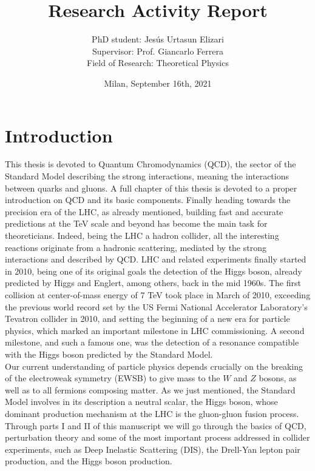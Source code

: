 \documentclass[12pt]{article}
\begin{document}
	
\title{Research Activity Report}
\author{PhD student: Jes\'us Urtasun Elizari \\
		Supervisor: Prof. Giancarlo Ferrera \\
		Field of Research: Theoretical Physics}
\date{Milan, September 16th, 2021}
\maketitle

\section{Introduction}

This thesis is devoted to Quantum Chromodynamics (QCD), the sector of the Standard Model describing the strong interactions, meaning the interactions between quarks and gluons. A full chapter of this thesis is devoted to a proper introduction on QCD and its basic components. Finally heading towards the precision era of the LHC, as already mentioned, building fast and accurate predictions at the TeV scale and beyond has become the main task for theoreticians. Indeed, being the LHC a hadron collider, all the interesting reactions originate from a hadronic scattering, mediated by the strong interactions and described by QCD. LHC and related experiments finally started in 2010, being one of its original goals the detection of the Higgs boson, already predicted by Higgs and Englert, among others, back in the mid 1960s. The first collision at center-of-mass energy of 7 TeV took place in March of 2010, exceeding the previous world record set by the US Fermi National Accelerator Laboratory’s Tevatron collider in 2010, and setting the beginning of a new era for particle physics, which marked an important milestone in LHC commissioning. A second milestone, and such a famous one, was the detection of a resonance compatible with the Higgs boson predicted by the Standard Model.\\

Our current understanding of particle physics depends crucially on the breaking of the electroweak symmetry (EWSB) to give mass to the $W$ and $Z$ bosons, as well as to all fermions composing matter. As we just mentioned, the Standard Model involves in its description a neutral scalar, the Higgs boson, whose dominant production mechanism at the LHC is the gluon-gluon fusion process. Through parts I and II of this manuscript we will go through the basics of QCD, perturbation theory and some of the most important process addressed in collider experiments, such as Deep Inelastic Scattering (DIS), the Drell-Yan lepton pair production, and the Higgs boson production.\\
\end{document}
